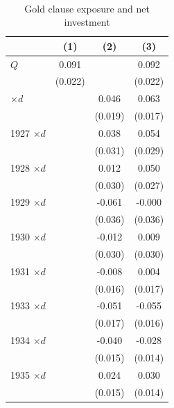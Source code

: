 \begin{table}[p]\centering
\caption{\\ Gold clause exposure and net investment } \footnotesize   \label{tab:inv_main}  \renewcommand{\arraystretch}{1.2}
\begin{tabular}{lccc}
\toprule
 & (1) & (2) & (3) \\
\midrule
$Q$              & 0.091\sym{***} &               & 0.092\sym{***} \\
                 & (0.022)        &               & (0.022)        \\
\addlinespace[0.35em]
1926 $\times d$  &                & 0.046\sym{**}  & 0.063\sym{***} \\
                 &                & (0.019)        & (0.017)        \\
1927 $\times d$  &                & 0.038           & 0.054\sym{*}   \\
                 &                & (0.031)        & (0.029)        \\
1928 $\times d$  &                & 0.012           & 0.050\sym{*}   \\
                 &                & (0.030)        & (0.027)        \\
1929 $\times d$  &                & -0.061          & -0.000         \\
                 &                & (0.036)        & (0.036)        \\
1930 $\times d$  &                & -0.012          & 0.009          \\
                 &                & (0.030)        & (0.030)        \\
1931 $\times d$  &                & -0.008          & 0.004          \\
                 &                & (0.016)        & (0.017)        \\
1933 $\times d$  &                & -0.051\sym{**}  & -0.055\sym{***}\\
                 &                & (0.017)        & (0.016)        \\
1934 $\times d$  &                & -0.040\sym{**}  & -0.028\sym{*}  \\
                 &                & (0.015)        & (0.014)        \\
1935 $\times d$  &                & 0.024           & 0.030\sym{**}  \\
                 &                & (0.015)        & (0.014)        \\

\end{tabular}
\end{table}
